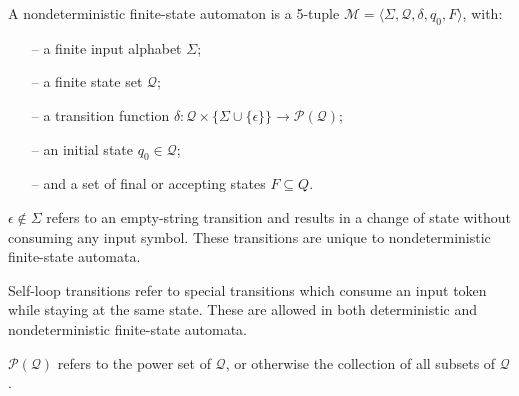 \begin{definition}
  \label{def:nfa}
  A nondeterministic finite-state automaton is a 5-tuple $\mathcal{M} = \langle
  \Sigma, \mathcal{Q}, \delta, q_0, F \rangle$, with:
  \begin{itemize}
    \itemsep0em
    \item[--] a finite input alphabet $\Sigma$;
    \item[--] a finite state set $\mathcal{Q}$;
    \item[--] a transition function $\delta: \mathcal{Q} \times \{\Sigma \cup
    \{\epsilon\}\} \rightarrow \mathcal{P}(\mathcal{Q})$;
    \item[--] an initial state $q_0 \in \mathcal{Q}$;
    \item[--] and a set of final or accepting states $F \subseteq Q$.
  \end{itemize}

  \begin{remark}
    $\epsilon \notin \Sigma$ refers to an empty-string transition
    and results in a change of state without consuming any input
    symbol. These transitions are unique to nondeterministic finite-state automata.
  \end{remark}

  \begin{remark}
    Self-loop transitions refer to special transitions which consume an input token
    while staying at the same state. These are allowed in both deterministic and
    nondeterministic finite-state automata.
  \end{remark}
  
  \begin{remark}
    $\mathcal{P}(\mathcal{Q})$ refers to the power set of $\mathcal{Q}$, or
    otherwise the collection of all subsets of $\mathcal{Q}$.
  \end{remark}
\end{definition}

